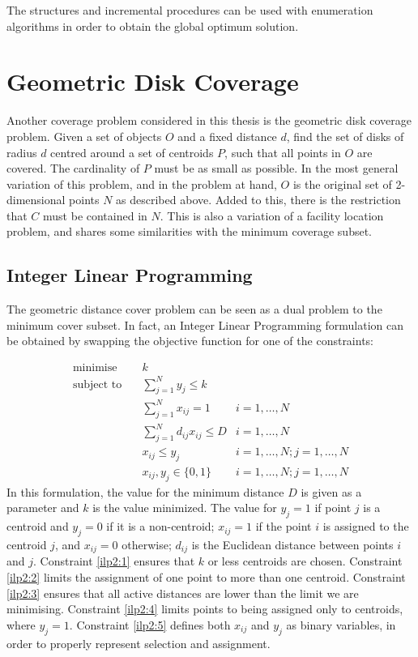 The structures and incremental procedures can be used with enumeration algorithms in order to obtain the global optimum solution.

\section{Geometric Disk Coverage}
\label{ilp2}
\begin{changed}
Another coverage problem considered in this thesis is the geometric disk coverage problem. Given a set of objects $O$ and a fixed distance $d$, find the set of disks of radius $d$ centred around a set of centroids $P$, such that all points in $O$ are covered. The cardinality of $P$ must be as small as possible. In the most general variation of this problem, and in the problem at hand, $O$ is the original set of 2-dimensional points $N$ as described above. Added to this, there is the restriction that $C$ must be contained in $N$. This is also a variation of a facility location problem, and shares some similarities with the minimum coverage subset. 

\subsection{Integer Linear Programming}
The geometric distance cover problem can be seen as a dual problem to the minimum cover subset. In fact, an Integer Linear Programming formulation can be obtained by swapping the objective function for one of the constraints:

\begin{align}
\text{minimise}   \quad& k							   &\\
\text{subject to} \quad
& \sum\limits_{j=1}^{N}{y_j} \leq k 
& 							\label{ilp2:1}\\
& \sum\limits_{j=1}^{N}{x_{ij}}	= 1   
& i=1,\ldots,N 				\label{ilp2:2}\\
& \sum\limits_{j=1}^{N}{d_{ij} x_{ij}} \leq D
& i=1,\ldots,N				\label{ilp2:3}\\
& x_{ij} \leq y_{j}				   
& i=1,\ldots,N;j=1,\ldots,N	\label{ilp2:4}\\
& x_{ij},y_{j} \in \{0,1\}
& i=1,\ldots,N;j=1,\ldots,N \label{ilp2:5}
\end{align}
In this formulation, the value for the minimum distance $D$ is given as a parameter and $k$ is the value minimized. The value for $y_j = 1$ if point $j$ is a centroid and $y_j = 0$ if it is a non-centroid;
$x_{ij} = 1$ if the point $i$ is assigned to the centroid $j$, and $x_{ij}=0$ otherwise;
$d_{ij}$ is the Euclidean distance between points $i$ and $j$.
Constraint \eqref{ilp2:1} ensures that $k$ or less centroids are chosen.
Constraint \eqref{ilp2:2} limits the assignment of one point to more than one centroid.
Constraint \eqref{ilp2:3} ensures that all active distances are lower than the limit we are minimising.
Constraint \eqref{ilp2:4} limits points to being assigned only to centroids, where $y_j=1$.
Constraint \eqref{ilp2:5} defines both $x_{ij}$ and $y_j$ as binary variables, in order to properly represent selection and assignment.
\end{changed}
